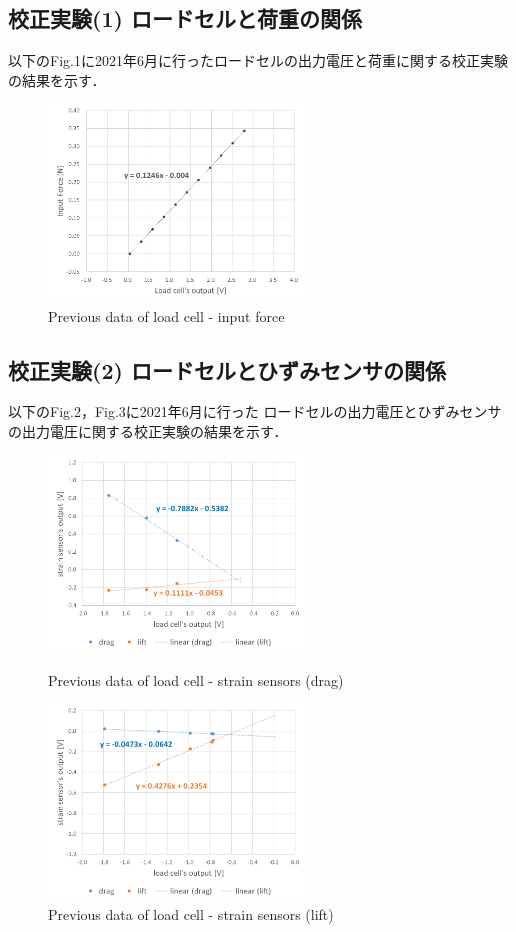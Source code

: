 \documentclass[twocolumn,a4j]{jsarticle}
\begin{document}
\subsection{校正実験(1) ロードセルと荷重の関係}
以下のFig.1に2021年6月に行ったロードセルの出力電圧と荷重に関する校正実験の結果を示す．

\begin{figure}[htbp]
    \footnotesize
    \begin{center}
        \includegraphics[width=68mm]{../images/calibration_1.png}
        \caption{Previous data of load cell - input force}
    \end{center}
\end{figure}

\newpage

\subsection{校正実験(2) ロードセルとひずみセンサの関係}
以下のFig.2，Fig.3に2021年6月に行った
ロードセルの出力電圧とひずみセンサの出力電圧に関する校正実験の結果を示す．

\begin{figure}[htbp]
    \footnotesize
    \begin{center}
        \includegraphics[width=68mm]{../images/graph_21119_drag_previous.png}
        \caption{Previous data of load cell - strain sensors (drag)}
        \includegraphics[width=68mm]{../images/graph_21119_lift_previous.png}
        \caption{Previous data of load cell - strain sensors (lift)}
    \end{center}
\end{figure}
\end{document}
